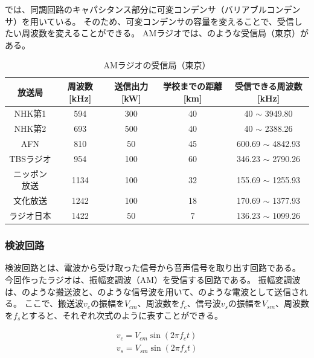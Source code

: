 \documentclass[report.tex]{subfiles}
\begin{document}
では、同調回路のキャパシタンス部分に可変コンデンサ（バリアブルコンデンサ）を用いている。
そのため、可変コンデンサの容量を変えることで、受信したい周波数を変えることができる。
AMラジオでは、のような受信局（東京）がある。

\begin{table}[h]
	\centering
	\caption{AMラジオの受信局（東京）}
	\label{tab:zyushin}
	\begin{tabular}{ccccc} \hline
		放送局    & 周波数[kHz] & 送信出力[kW] & 学校までの距離[km] & 受信できる周波数[kHz]           \\ \hline
		NHK第1  & 594      & 300      & 40          & 40 \(\sim\) 3949.80     \\
		NHK第2  & 693      & 500      & 40          & 40 \(\sim\) 2388.26     \\
		AFN    & 810      & 50       & 45          & 600.69 \(\sim\) 4842.93 \\
		TBSラジオ & 954      & 100      & 60          & 346.23 \(\sim\) 2790.26 \\
		ニッポン放送 & 1134     & 100      & 32          & 155.69 \(\sim\) 1255.93 \\
		文化放送   & 1242     & 100      & 18          & 170.69 \(\sim\) 1377.93 \\
		ラジオ日本  & 1422     & 50       & 7           & 136.23 \(\sim\) 1099.26 \\ \hline
	\end{tabular}
\end{table}

\subsubsection{検波回路}

検波回路とは、電波から受け取った信号から音声信号を取り出す回路である。
今回作ったラジオは、振幅変調波（AM）を受信する回路である。
振幅変調波は、のような搬送波と、のような信号波を用いて、のような電波として送信される。
ここで、搬送波\(v_c\)の振幅を\(V_{cm}\)、周波数を\(f_c\)、信号波\(v_s\)の振幅を\(V_{sm}\)、周波数を\(f_s\)とすると、それぞれ次式のように表すことができる。

\begin{align}
	v_c = V_{cm} \sin(2 \pi f_c t) \\
	v_s = V_{sm} \sin(2 \pi f_s t) \\
\end{align}
\end{document}
